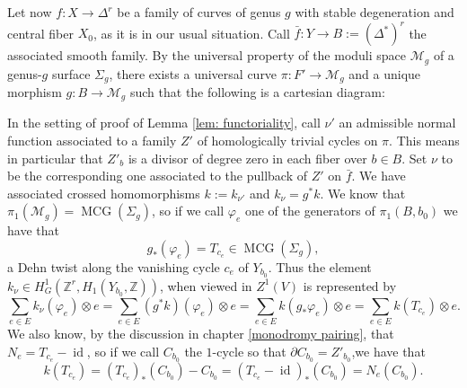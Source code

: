 \documentclass[a4paper,12 pt,titlepage,twoside]{book}
\newcommand{\numberset}{\mathbb}
\newcommand{\Z}{\numberset{Z}}
\DeclareMathOperator{\mcg}{MCG}
\DeclareMathOperator{\id}{id}
\theoremstyle{plain}
\theoremstyle{theorem}
\theoremstyle{definition}
\theoremstyle{remark}
\begin{document}
	Let now $f \colon X \rightarrow \Delta^r$ be a family of curves of genus $g$ with stable degeneration and central fiber $X_0$, as it is in our usual situation. Call $\bar{f} \colon Y \rightarrow B:=(\Delta^*)^r$ the associated smooth family. By the universal property of the moduli space $\mathcal{M}_g$ of a genus-$g$ surface $\Sigma_g$, there exists a universal curve $\pi \colon F' \rightarrow \mathcal{M}_g$ and a unique morphism $g \colon B \rightarrow \mathcal{M}_g$ such that the following is a cartesian diagram: \begin{center}
	\end{center}
	In the setting of proof of Lemma \ref{lem: functoriality}, call $\nu'$ an admissible normal function associated to a family $Z'$ of homologically trivial cycles on $\pi$. This means in particular that $Z'_b$ is a divisor of degree zero in each fiber over $b \in B$. Set $\nu$ to be the corresponding one associated to the pullback of $Z'$ on $\bar{f}$. We have associated crossed homomorphisms $k:= k_{\nu'}$ and $k_\nu= g^*k$.
	We know that $\pi_1(\mathcal{M}_g) = \mcg(\Sigma_g)$, so if we call $\varphi_e$ one of the generators of $\pi_1(B, b_0)$ we have that $$g_*(\varphi_e)= T_{c_e} \in \mcg(\Sigma_g),$$ a Dehn twist along the vanishing cycle $c_e$ of $Y_{b_0}$. Thus the element $k_\nu \in H^1_G(\Z^r, H_{1}(Y_{b_0}, \Z))$, when viewed in $Z^1(V)$ is represented by \begin{equation}\label{eq: representative of sing}
	\sum_{e \in E} k_\nu(\varphi_e) \otimes e = \sum_{e \in E} (g^*k)(\varphi_e) \otimes e = \sum_{e \in E} k(g_*\varphi_e) \otimes e = \sum_{e \in E} k(T_{c_e})\otimes e.
	\end{equation} We also know, by the discussion in chapter \ref{monodromy pairing}, that $N_e = T_{c_e}-\id$, so if we call $C_{b_0}$ the $1$-cycle so that $\partial C_{b_0} = Z'_{b_0}$,we have that $$k(T_{c_e}) = (T_{c_e})_*(C_{b_0}) - C_{b_0} = (T_{c_e}-\id)_*(C_{b_0}) = N_e(C_{b_0}).$$
	\newpage
\end{document}
